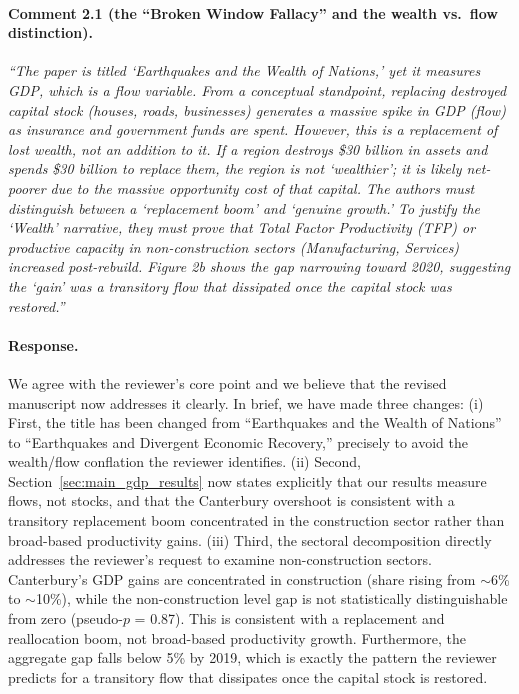\paragraph{Comment 2.1 (the ``Broken Window Fallacy'' and the wealth vs.\ flow distinction).}
\textit{``The paper is titled `Earthquakes and the Wealth of Nations,' yet it measures GDP, which is a flow variable. From a conceptual standpoint, replacing destroyed capital stock (houses, roads, businesses) generates a massive spike in GDP (flow) as insurance and government funds are spent. However, this is a replacement of lost wealth, not an addition to it. If a region destroys \$30 billion in assets and spends \$30 billion to replace them, the region is not `wealthier'; it is likely net-poorer due to the massive opportunity cost of that capital. The authors must distinguish between a `replacement boom' and `genuine growth.' To justify the `Wealth' narrative, they must prove that Total Factor Productivity (TFP) or productive capacity in non-construction sectors (Manufacturing, Services) increased post-rebuild. Figure 2b shows the gap narrowing toward 2020, suggesting the `gain' was a transitory flow that dissipated once the capital stock was restored.''}

\paragraph{Response.} We agree with the reviewer's core point and we believe that the revised manuscript now addresses it clearly. In brief, we have made three changes: (i) First, the title has been changed from ``Earthquakes and the Wealth of Nations'' to ``Earthquakes and Divergent Economic Recovery,'' precisely to avoid the wealth/flow conflation the reviewer identifies. (ii) Second, Section~\ref{sec:main_gdp_results} now states explicitly that our results measure flows, not stocks, and that the Canterbury overshoot is consistent with a transitory replacement boom concentrated in the construction sector rather than broad-based productivity gains. (iii) Third, the sectoral decomposition directly addresses the reviewer's request to examine non-construction sectors. Canterbury's GDP gains are concentrated in construction (share rising from ${\sim}$6\% to ${\sim}$10\%), while the non-construction level gap is not statistically distinguishable from zero (pseudo-$p$ = 0.87). This is consistent with a replacement and reallocation boom, not broad-based productivity growth. Furthermore, the aggregate gap falls below 5\% by 2019, which is exactly the pattern the reviewer predicts for a transitory flow that dissipates once the capital stock is restored.

